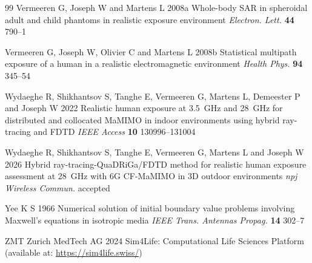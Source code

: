 \documentclass{iopjournal}
\begin{document}
\begin{thebibliography}{99}
Vermeeren G, Joseph W and Martens L 2008a Whole-body SAR in spheroidal adult and child phantoms in realistic exposure environment \emph{Electron. Lett.} \textbf{44} 790--1

Vermeeren G, Joseph W, Olivier C and Martens L 2008b Statistical multipath exposure of a human in a realistic electromagnetic environment \emph{Health Phys.} \textbf{94} 345--54

Wydaeghe R, Shikhantsov S, Tanghe E, Vermeeren G, Martens L, Demeester P and Joseph W 2022 Realistic human exposure at 3.5~GHz and 28~GHz for distributed and collocated MaMIMO in indoor environments using hybrid ray-tracing and FDTD \emph{IEEE Access} \textbf{10} 130996--131004

Wydaeghe R, Shikhantsov S, Tanghe E, Vermeeren G, Martens L and Joseph W 2026 Hybrid ray-tracing-QuaDRiGa/FDTD method for realistic human exposure assessment at 28~GHz with 6G CF-MaMIMO in 3D outdoor environments \emph{npj Wireless Commun.} accepted

Yee K S 1966 Numerical solution of initial boundary value problems involving Maxwell's equations in isotropic media \emph{IEEE Trans. Antennas Propag.} \textbf{14} 302--7

ZMT Zurich MedTech AG 2024 Sim4Life: Computational Life Sciences Platform (available at: \url{https://sim4life.swiss/})

\end{thebibliography}
\end{document}
